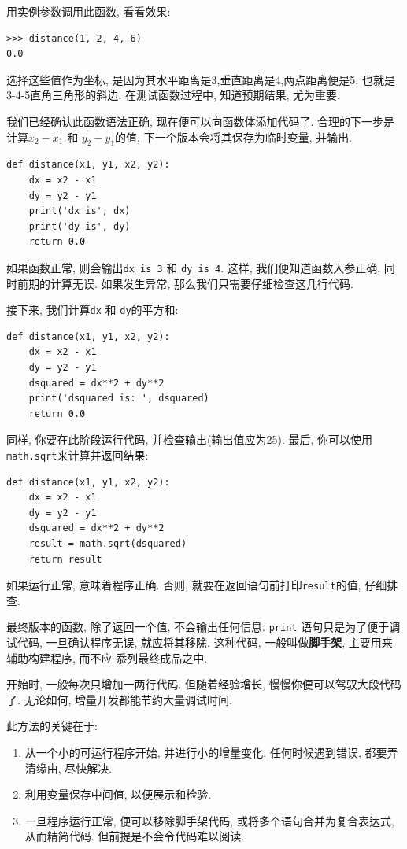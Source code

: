 \documentclass[10pt]{book}
\begin{document}
用实例参数调用此函数, 看看效果:

\begin{verbatim}
>>> distance(1, 2, 4, 6)
0.0
\end{verbatim}
%
选择这些值作为坐标, 是因为其水平距离是3,垂直距离是4,两点距离便是5, 
也就是3-4-5直角三角形的斜边. 
在测试函数过程中, 知道预期结果, 尤为重要. 

我们已经确认此函数语法正确, 现在便可以向函数体添加代码了. 
合理的下一步是计算$x_2 - x_1$ 和 $y_2 - y_1$的值, 
下一个版本会将其保存为临时变量, 并输出. 

\begin{verbatim}
def distance(x1, y1, x2, y2):
    dx = x2 - x1
    dy = y2 - y1
    print('dx is', dx)
    print('dy is', dy)
    return 0.0
\end{verbatim}
%
如果函数正常, 则会输出\verb"dx is 3" 和 \verb"dy is 4". 
这样, 我们便知道函数入参正确, 同时前期的计算无误. 
如果发生异常, 那么我们只需要仔细检查这几行代码. 

接下来, 我们计算{\tt dx} 和 {\tt dy}的平方和:

\begin{verbatim}
def distance(x1, y1, x2, y2):
    dx = x2 - x1
    dy = y2 - y1
    dsquared = dx**2 + dy**2
    print('dsquared is: ', dsquared)
    return 0.0
\end{verbatim}
%
同样, 你要在此阶段运行代码, 并检查输出(输出值应为25). 
最后, 你可以使用{\tt math.sqrt}来计算并返回结果:

\begin{verbatim}
def distance(x1, y1, x2, y2):
    dx = x2 - x1
    dy = y2 - y1
    dsquared = dx**2 + dy**2
    result = math.sqrt(dsquared)
    return result
\end{verbatim}
%
如果运行正常, 意味着程序正确. 
否则, 就要在返回语句前打印{\tt result}的值, 仔细排查. 

最终版本的函数, 除了返回一个值, 不会输出任何信息. 
{\tt print} 语句只是为了便于调试代码, 一旦确认程序无误, 就应将其移除. 
这种代码, 一般叫做{\bf 脚手架},  主要用来辅助构建程序, 而不应
忝列最终成品之中. 

开始时, 一般每次只增加一两行代码. 但随着经验增长, 慢慢你便可以驾驭大段代码了. 
无论如何, 增量开发都能节约大量调试时间.

此方法的关键在于:

\begin{enumerate}

\item 从一个小的可运行程序开始, 并进行小的增量变化. 任何时候遇到错误, 都要弄清缘由, 尽快解决. 

\item 利用变量保存中间值, 以便展示和检验. 

\item 一旦程序运行正常, 便可以移除脚手架代码, 或将多个语句合并为复合表达式, 从而精简代码. 
但前提是不会令代码难以阅读. 

\end{enumerate}
\end{document}
